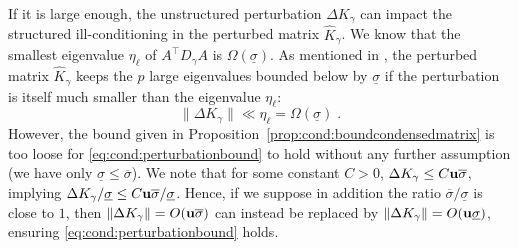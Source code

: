 If it is large enough,
the unstructured perturbation $\Delta K_\gamma$
can impact the structured ill-conditioning in the perturbed
matrix $\widehat{K}_\gamma$.
We know that the smallest eigenvalue $\eta_\ell$ of $A^\top D_\gamma A$
is $\Omega(\underline{\sigma})$. As mentioned in
\cite[Section 3.4.2]{wright1998ill}, the perturbed matrix
$\widehat{K}_\gamma$ keeps the $p$ large eigenvalues
bounded below by $\underline{\sigma}$ if the perturbation
is itself much smaller than the eigenvalue $\eta_\ell$:
\begin{equation}
  \label{eq:cond:perturbationbound}
  \| \Delta K_\gamma \| \ll \eta_\ell = \Omega(\underline{\sigma})  \; .
\end{equation}
However, the bound given in Proposition~\ref{prop:cond:boundcondensedmatrix} is too loose
for \eqref{eq:cond:perturbationbound} to hold without any further assumption
(we have only $\underline{\sigma} \leq \overline{\sigma}$).
We note that for some constant $C > 0$, $\Delta K_\gamma \leq C \mathbf{u} \overline{\sigma}$,
implying $\Delta K_\gamma / \underline{\sigma} \leq C \mathbf{u} \overline{\sigma} / \underline{\sigma}$.
Hence, if we suppose in addition the ratio $\overline{\sigma}/\underline{\sigma}$ is close to $1$,
then $\|\Delta K_\gamma\| = O(\mathbf{u} \overline{\sigma})$ can instead be replaced by
$\| \Delta K_\gamma\|= O(\mathbf{u} \underline{\sigma})$, ensuring \eqref{eq:cond:perturbationbound} holds.

